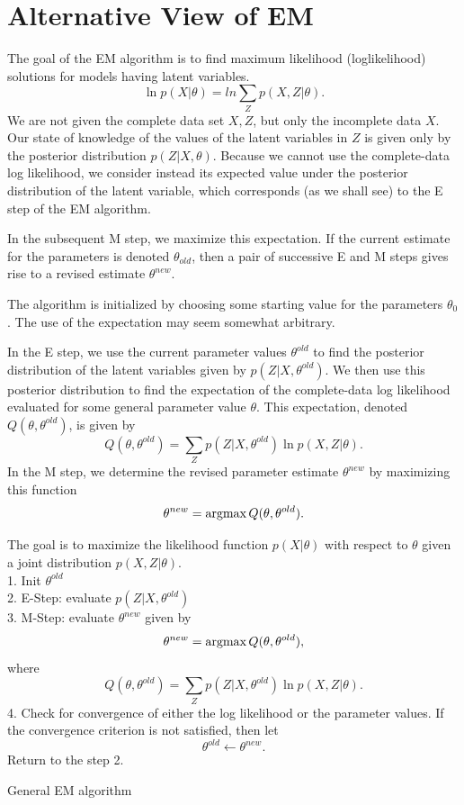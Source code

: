 \section{Alternative View of EM}
The goal of the EM algorithm is to find maximum likelihood (loglikelihood) solutions for models having latent variables.
$$\ln p(X|\theta) = ln\sum_Z p(X,Z|\theta).$$
We are not given the complete data set ${X, Z}$, but only the incomplete data $X$. Our state of knowledge of the values of the latent variables
in $Z$ is given only by the posterior distribution $p(Z|X, \theta)$. Because we cannot use the complete-data log likelihood, we consider instead its expected value under the posterior distribution of the latent variable, which corresponds (as we shall see) to the E step of the EM algorithm.

In the subsequent M step, we maximize this expectation. If the current estimate for the parameters is denoted $\theta_{old}$, then a pair of successive E and M steps gives rise to a revised estimate $\theta^{new}$.

The algorithm is initialized by choosing some starting value for the parameters $\theta_0$. The use of the expectation may seem somewhat arbitrary.

In the E step, we use the current parameter values $\theta^{old}$ to find the posterior distribution of the latent variables given by $p(Z|X, \theta^{old})$. We then use this posterior distribution to find the expectation of the complete-data log likelihood evaluated for some general parameter value $\theta$. This expectation, denoted $Q(\theta, \theta^{old})$, is given by 
$$Q(\theta, \theta^{old}) = \sum_Z p(Z|X, \theta^{old})\ln p(X,Z|\theta).$$
In the M step, we determine the revised parameter estimate $\theta^{new}$ by maximizing this function
$$\theta^{new}=\operatorname*{\operatorname{argmax}} Q(\theta, \theta^{old}).$$


\begin{algorithm}
The goal is to maximize the likelihood function $p(X|\theta)$ with respect to $\theta$ given a joint distribution $p(X, Z|\theta)$.\\
1. Init $\theta^{old}$\\
2. E-Step: evaluate $p(Z|X, \theta^{old})$ \\
3. M-Step: evaluate $\theta^{new}$ given by 
$$\theta^{new} = \operatorname*{\operatorname{argmax}} Q(\theta, \theta^{old}),$$
where
$$Q(\theta, \theta^{old}) = \sum_Z p(Z|X, \theta^{old})\ln p(X,Z|\theta).$$
4. Check for convergence of either the log likelihood or the parameter values. If the convergence criterion is not satisfied, then let
$$\theta^{old}\leftarrow \theta^{new}.$$
Return to the step 2. 
\caption{General EM algorithm}
\end{algorithm}

